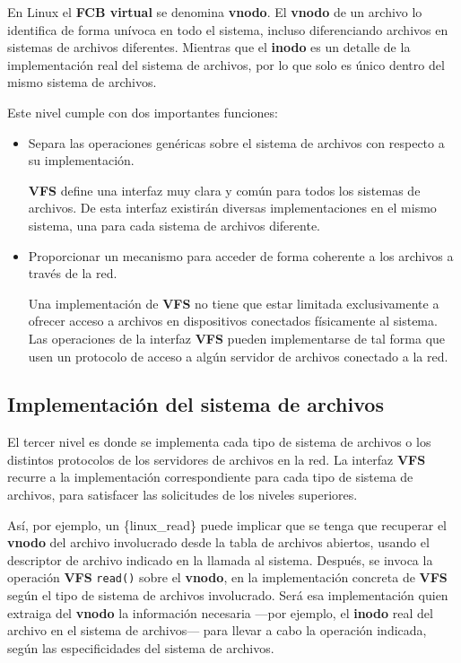 En Linux el \textbf{FCB virtual} se denomina \textbf{{}vnodo}. El
\textbf{vnodo} de un archivo lo identifica de forma unívoca en todo el
sistema, incluso diferenciando archivos en sistemas de archivos
diferentes. Mientras que el \textbf{inodo} es un detalle de la
implementación real del sistema de archivos, por lo que solo es único
dentro del mismo sistema de archivos.

Este nivel cumple con dos importantes funciones:

\begin{itemize}
\item
  Separa las operaciones genéricas sobre el sistema de archivos con
  respecto a su implementación.

  \textbf{VFS} define una interfaz muy clara y común para todos los
  sistemas de archivos. De esta interfaz existirán diversas
  implementaciones en el mismo sistema, una para cada sistema de
  archivos diferente.
\item
  Proporcionar un mecanismo para acceder de forma coherente a los
  archivos a través de la red.

  Una implementación de \textbf{VFS} no tiene que estar limitada
  exclusivamente a ofrecer acceso a archivos en dispositivos conectados
  físicamente al sistema. Las operaciones de la interfaz \textbf{VFS}
  pueden implementarse de tal forma que usen un protocolo de acceso a
  algún servidor de archivos conectado a la red.
\end{itemize}

\subsection{Implementación del sistema de
archivos}\label{_implementaciuxf3n_del_sistema_de_archivos}

El tercer nivel es donde se implementa cada tipo de sistema de archivos
o los distintos protocolos de los servidores de archivos en la red. La
interfaz \textbf{VFS} recurre a la implementación correspondiente para
cada tipo de sistema de archivos, para satisfacer las solicitudes de los
niveles superiores.

Así, por ejemplo, un \{linux\_read\} puede implicar que se tenga que
recuperar el \textbf{vnodo} del archivo involucrado desde la tabla de
archivos abiertos, usando el descriptor de archivo indicado en la
llamada al sistema. Después, se invoca la operación \textbf{VFS}
\texttt{read()} sobre el \textbf{vnodo}, en la implementación concreta
de \textbf{VFS} según el tipo de sistema de archivos involucrado. Será
esa implementación quien extraiga del \textbf{vnodo} la información
necesaria ---por ejemplo, el \textbf{inodo} real del archivo en el
sistema de archivos--- para llevar a cabo la operación indicada, según
las especificidades del sistema de archivos.

